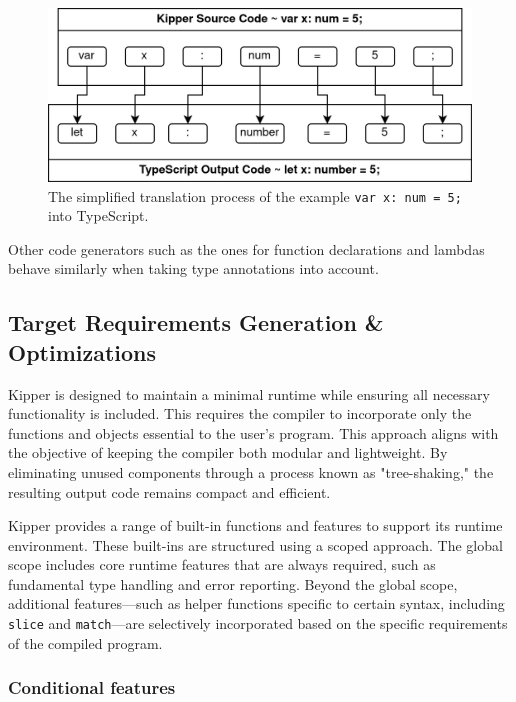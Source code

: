 \begin{figure}[h!]
	\centering
	\includegraphics[scale=1.1]{./pics/Kipper-to-TypeScript-Translation-Example}
	\caption{The simplified translation process of the example \lstinline|var x: num = 5;| into TypeScript.}
	\label{fig:implementation:kipper-to-typescript-translation-example}
\end{figure}

Other code generators such as the ones for function declarations and lambdas behave similarly when taking type annotations into account.

\subsection{Target Requirements Generation \& Optimizations}
\label{sec:requirements-generation-and-optimizations}

Kipper is designed to maintain a minimal runtime while ensuring all necessary functionality is included. This requires the compiler to incorporate only the functions and objects essential to the user's program. This approach aligns with the objective of keeping the compiler both modular and lightweight. By eliminating unused components through a process known as "tree-shaking," the resulting output code remains compact and efficient.

Kipper provides a range of built-in functions and features to support its runtime environment. These built-ins are structured using a scoped approach. The global scope includes core runtime features that are always required, such as fundamental type handling and error reporting. Beyond the global scope, additional features—such as helper functions specific to certain syntax, including \lstinline|slice| and \lstinline|match|—are selectively incorporated based on the specific requirements of the compiled program.

\subsubsection{Conditional features}
\label{sec:conditional-features}

